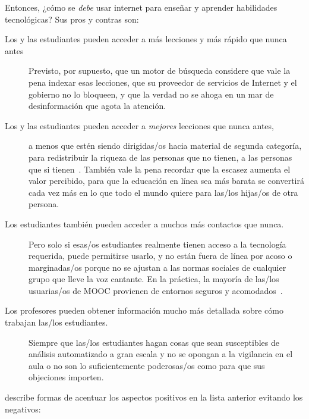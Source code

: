 Entonces, ¿cómo se \emph{debe} usar internet para enseñar y aprender habilidades tecnológicas?
Sus pros y contras son:

\begin{description}

\item[Los y las estudiantes pueden acceder a más lecciones y más rápido que nunca antes]
  Previsto,
  por supuesto,
  que un motor de búsqueda considere que vale la pena indexar esas lecciones,
  que su proveedor de servicios de Internet y el gobierno no lo bloqueen,
  y que la verdad no se ahoga en un mar de desinformación que agota la atención.

\item[Los y las estudiantes pueden acceder a \emph{mejores} lecciones que nunca antes,]
  a menos que estén siendo dirigidas/os hacia material de segunda categoría,
  para redistribuir la riqueza de las personas que no tienen, a las personas que si tienen~\cite{McMi2017}.
  También vale la pena recordar que la escasez aumenta el valor percibido,
  para que la educación en línea sea más barata
  se convertirá cada vez más en lo que todo el mundo quiere para las/los hijas/os de otra persona.

\item[Los estudiantes también pueden acceder a muchos más contactos que nunca.]
  Pero solo si esas/os estudiantes realmente tienen acceso a la tecnología requerida,
  puede permitirse usarlo,
  y no están fuera de línea por acoso o marginadas/os
  porque no se ajustan a las normas sociales de cualquier grupo que lleve la voz cantante.
  En la práctica,
  la mayoría de las/los usuarias/os de MOOC provienen de entornos seguros y acomodados~\cite{Hans2015}.

\item[Los profesores pueden obtener información mucho más detallada sobre cómo trabajan las/los estudiantes.]
  Siempre que las/los estudiantes hagan cosas que sean susceptibles de análisis automatizado a gran escala
  y no se opongan a la vigilancia en el aula
  o no son lo suficientemente poderosas/os como para que sus objeciones importen.

\end{description}

\cite{Marg2015,Mill2016a,Nils2017} describe formas de acentuar los aspectos positivos en la lista anterior
evitando los negativos:

